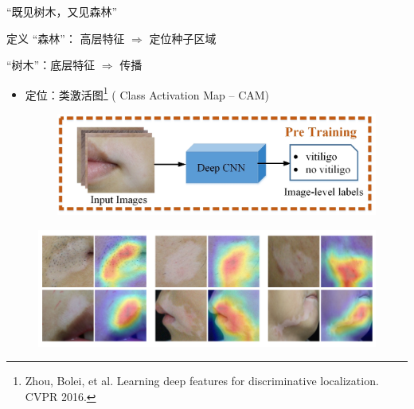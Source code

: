 \begin{frame}{``既见树木，又见森林''}
\begin{block}{定义}
``森林''： 高层特征 $\Rightarrow$ 定位种子区域

``树木''：底层特征 $\Rightarrow$ 传播
\end{block}

\vfill 
\pause
\begin{itemize}
\item 定位：类激活图\footnote[frame]{\tiny Zhou, Bolei, et al. Learning deep features for discriminative localization. CVPR 2016.} ( {\color{red}C}lass {\color{red}A}ctivation {\color{red}M}ap -- {\color{red}CAM})
\begin{figure}
    \centering
    \includegraphics[width=0.5\linewidth]{figures/TrainForCam.jpg}
\end{figure}
\end{itemize}

\vspace{-0.2cm}

\begin{figure}
    \centering
    \includegraphics[width=0.65\linewidth]{figures/cam.jpg}
\end{figure}

\end{frame}
